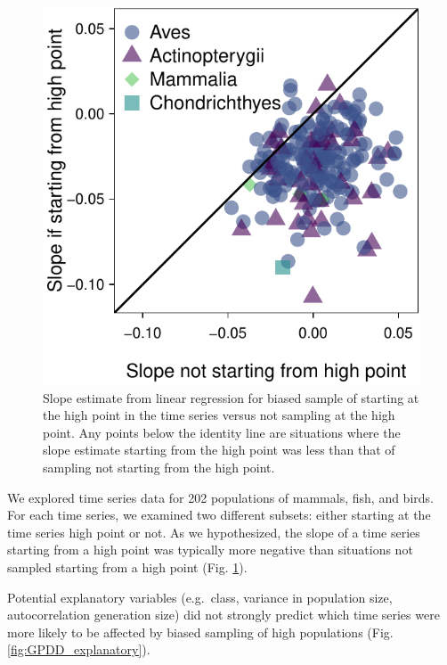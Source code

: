 \documentclass[]{article}
\begin{document}
\begin{figure}
\centering
\includegraphics{Empirical_Investigation_files/figure-latex/unnamed-chunk-5-1.pdf}
\caption{Slope estimate from linear regression for biased sample of
starting at the high point in the time series versus not sampling at the
high point. Any points below the identity line are situations where the
slope estimate starting from the high point was less than that of
sampling not starting from the high point.\label{fig:GPDD_high_point}}
\end{figure}

We explored time series data for 202 populations of mammals, fish, and
birds. For each time series, we examined two different subsets: either
starting at the time series high point or not. As we hypothesized, the
slope of a time series starting from a high point was typically more
negative than situations not sampled starting from a high point (Fig.
\ref{fig:GPDD_high_point}).

Potential explanatory variables (e.g.~class, variance in population
size, autocorrelation generation size) did not strongly predict which
time series were more likely to be affected by biased sampling of high
populations (Fig. \ref{fig:GPDD_explanatory}).
\end{document}
